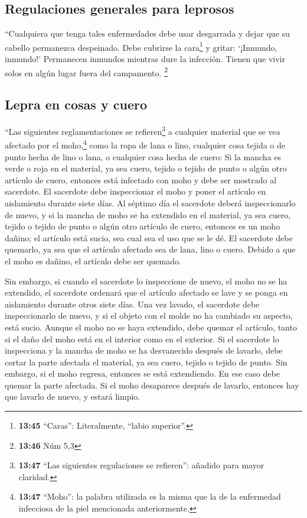 \hypertarget{regulaciones-generales-para-leprosos}{%
\subsection{Regulaciones generales para
leprosos}\label{regulaciones-generales-para-leprosos}}

 ``Cualquiera que tenga tales enfermedades debe usar
desgarrada y dejar que su cabello permanezca despeinado. Debe cubrirse
la cara\footnote{\textbf{13:45} ``Caras'': Literalmente, ``labio
  superior''.} y gritar: `¡Inmundo, inmundo!'  Permanecen
inmundos mientras dure la infección. Tienen que vivir solos en algún
lugar fuera del campamento. \footnote{\textbf{13:46} Núm 5,3}

\hypertarget{lepra-en-cosas-y-cuero}{%
\subsection{Lepra en cosas y cuero}\label{lepra-en-cosas-y-cuero}}

 ``Las siguientes reglamentaciones se refieren\footnote{\textbf{13:47}
  ``Las siguientes regulaciones se refieren'': añadido para mayor
  claridad.} a cualquier material que se vea afectado por el
moho,\footnote{\textbf{13:47} ``Moho'': la palabra utilizada es la misma
  que la de la enfermedad infecciosa de la piel mencionada
  anteriormente.} como la ropa de lana o lino,  cualquier
cosa tejida o de punto hecha de lino o lana, o cualquier cosa hecha de
cuero:  Si la mancha es verde o roja en el material, ya
sea cuero, tejido o tejido de punto o algún otro artículo de cuero,
entonces está infectado con moho y debe ser mostrado al sacerdote.
 El sacerdote debe inspeccionar el moho y poner el
artículo en aislamiento durante siete días.  Al séptimo
día el sacerdote deberá inspeccionarlo de nuevo, y si la mancha de moho
se ha extendido en el material, ya sea cuero, tejido o tejido de punto o
algún otro artículo de cuero, entonces es un moho dañino; el artículo
está sucio, sea cual sea el uso que se le dé.  El
sacerdote debe quemarlo, ya sea que el artículo afectado sea de lana,
lino o cuero. Debido a que el moho es dañino, el artículo debe ser
quemado.

 Sin embargo, si cuando el sacerdote lo inspeccione de
nuevo, el moho no se ha extendido,  el sacerdote ordenará
que el artículo afectado se lave y se ponga en aislamiento durante otros
siete días.  Una vez lavado, el sacerdote debe
inspeccionarlo de nuevo, y si el objeto con el molde no ha cambiado su
aspecto, está sucio. Aunque el moho no se haya extendido, debe quemar el
artículo, tanto si el daño del moho está en el interior como en el
exterior.  Si el sacerdote lo inspecciona y la mancha de
moho se ha desvanecido después de lavarlo, debe cortar la parte afectada
el material, ya sea cuero, tejido o tejido de punto.  Sin
embargo, si el moho regresa, entonces se está extendiendo. En ese caso
debe quemar la parte afectada.  Si el moho desaparece
después de lavarlo, entonces hay que lavarlo de nuevo, y estará limpio.

